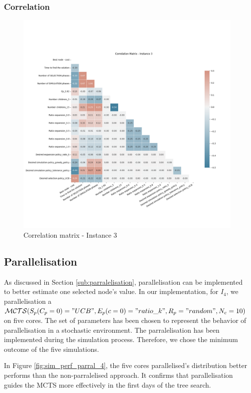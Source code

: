 \subsubsection*{Correlation}
\begin{figure}[!ht]
    \centering
    \includegraphics[width=\textwidth]{Figures/3 - correlation_matrix.png}
    \caption{Correlation matrix - Instance 3}
    \label{fig:corr_3}
\end{figure}
\newpage
\newpage
\subsection{Parallelisation}
As discussed in Section \ref{sub:parralelisation}, parallelisation can be implemented to better estimate one selected node's value.
In our implementation, for $I_4$, we parallelisation a $\mathcal{MCTS}(S_p(C_p=0)="UCB",E_p(c=0)="ratio\_k",R_p="random",N_c=10)$ on five cores. The set of parameters has been chosen to represent the behavior of parallelisation in a stochastic environment.  The parralelisation has been implemented during the simulation process. Therefore, we chose the minimum outcome of the five simulations.

In Figure \ref{fig:sim_perf_parral_4}, the five cores parallelised's distribution better performs than the non-parralelised approach. It confirms that parallelisation guides the MCTS more effectively in the first days of the tree search.


